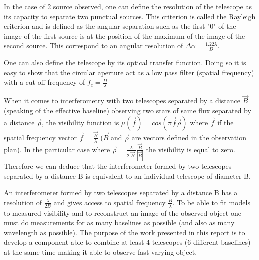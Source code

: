 In the case of 2 source observed, one can define the resolution of the telescope as its capacity to separate two punctual sources. This criterion is called the Rayleigh criterion and is defined as the angular separation such as the first "0" of the image of the first source is at the position of the maximum of the image of the second source. This correspond to an angular resolution of $\Delta \alpha = \frac{1.22\lambda}{D}$. 

One can also define the telescope by its optical transfer function. Doing so it is easy to show that the circular aperture act as a low pass filter (spatial frequency) with a cut off frequency of $f_c = \frac{D}{\lambda}$

When it comes to interferometry with two telescopes separated by a distance $\vec{B}$ (speaking of the effective baseline) observing two stars of same flux separated by a distance $\vec{\rho}$, the visibility function is $\mu(\vec{f})=cos(\pi \vec{f} \dot{} \vec{\rho})$ where $\vec{f}$ if the spatial frequency vector $\vec{f} = \frac{\vec{B}}{\lambda}$ ($\vec{B}$ and $\vec{\rho}$ are vectors defined in the observation plan). In the particular case where $\vec{\rho}= \frac{\lambda}{2\left|\vec{B}\right|} \frac{\vec{B}}{\left|\vec{B}\right|}$ the visibility is equal to zero. Therefore we can deduce that the interferometer formed by two telescopes separated by a distance B is equivalent to an individual telescope of diameter B.  

An interferometer formed by two telescopes separated by a distance B has a resolution of $\frac{\lambda}{2B}$ and gives access to spatial frequency $\frac{B}{\lambda}$. To be able to fit models to measured visibility and to reconstruct an image of the observed object one must do measurements for as many baselines as possible (and also as many wavelength as possible). The purpose of the work presented in this report is to develop a component able to combine at least 4 telescopes (6 different baselines) at the same time making it able to observe fast varying object.



